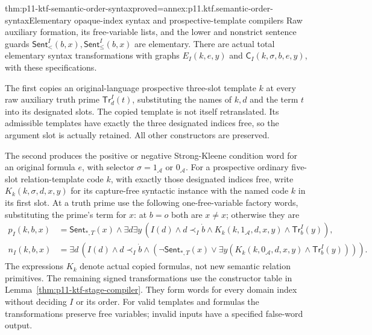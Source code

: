 \begin{hblemma}{thm:p11-ktf-semantic-order-syntax}{proved=annex:p11.ktf.semantic-order-syntax}{Elementary opaque-index syntax and prospective-template compilers}
Raw auxiliary formation, its free-variable lists, and the lower and
nonstrict sentence guards
\(\mathsf{Sent}^{I}_{<}(b,x),\mathsf{Sent}^{I}_{\leq}(b,x)\)
are elementary. There are actual total elementary syntax transformations
with graphs \(E_I(k,e,y)\) and
\(\mathsf C_I(k,\sigma,b,e,y)\), with these specifications.

The first copies an original-language prospective three-slot template
\(k\) at every raw auxiliary truth prime
\(\mathsf{Tr}^{I}_d(t)\), substituting the names of \(k,d\)
and the term \(t\) into its designated slots. The copied template
is not itself retranslated. Its admissible templates have exactly the
three designated indices free, so the argument slot is actually retained.
All other constructors are preserved.

The second produces the positive or negative Strong-Kleene condition
word for an original formula \(e\), with selector
\(\sigma=1_{\mathcal A}\) or \(0_{\mathcal A}\).
For a prospective ordinary five-slot relation-template code \(k\),
with exactly those designated indices free,
write \(K_k(k,\sigma,d,x,y)\) for its capture-free syntactic
instance with the named code \(k\) in its first slot. At a truth
prime use the following one-free-variable factory words, substituting
the prime's term for \(x\): at \(b=o\) both are \(x\ne x\);
otherwise they are
\[
\begin{split}
 p_I(k,b,x)&=\mathsf{Sent}_{*,T}(x)\land
   \exists d\exists y\,
    (I(d)\land d\prec_I\dot b\land
     K_k(k,1_{\mathcal A},d,x,y)\land\mathsf{Tr}^{I}_b(y)),\\
 n_I(k,b,x)&=\exists d\,
   (I(d)\land d\prec_I\dot b\land
    (\neg\mathsf{Sent}_{*,T}(x)\lor
       \exists y(K_k(k,0_{\mathcal A},d,x,y)
                                  \land\mathsf{Tr}^{I}_b(y)))).
\end{split}
\]
The expressions \(K_k\) denote actual copied formulas, not new
semantic relation primitives. The remaining signed transformations
use the constructor table in Lemma~\ref{thm:p11-ktf-stage-compiler}.
They form words for every domain index without deciding \(I\) or
its order. For valid templates and formulas the transformations preserve
free variables; invalid inputs have a specified false-word output.
\end{hblemma}

